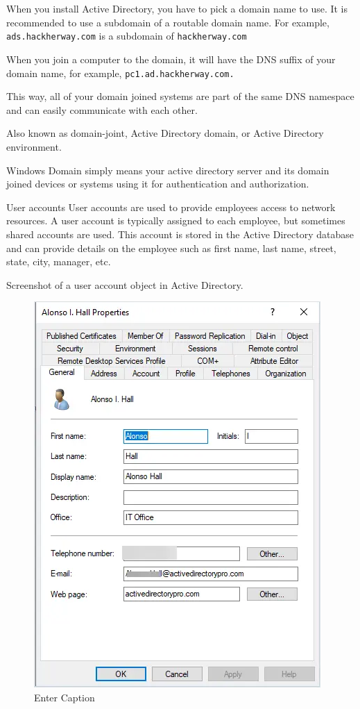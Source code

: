 When you install Active Directory, you have to pick a domain name to use. It is recommended to use a subdomain of a routable domain name. For example, \texttt{ ads.hackherway.com} is a subdomain of \texttt{hackherway.com}

When you join a computer to the domain, it will have the DNS suffix of your domain name, for example, \texttt{pc1.ad.hackherway.com.}

This way, all of your domain joined systems are part of the same DNS namespace and can easily communicate with each other.

Also known as domain-joint, Active Directory domain, or Active Directory environment.

Windows Domain simply means your active directory server and its domain joined devices or systems using it for authentication and authorization.

User accounts
User accounts are used to provide employees access to network resources. A user account is typically assigned to each employee, but sometimes shared accounts are used. This account is stored in the Active Directory database and can provide details on the employee such as first name, last name, street, state, city, manager, etc.

Screenshot of a user account object in Active Directory.

\begin{figure}
    \centering
    \includegraphics[width=0.75\linewidth]{aduser.png}
    \caption{Enter Caption}
    \label{fig:placeholder}
\end{figure}

